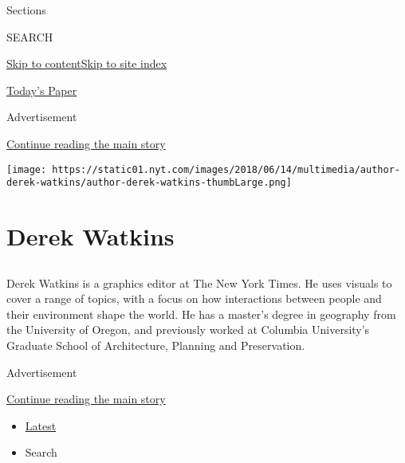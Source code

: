 Sections

SEARCH

\protect\hyperlink{site-content}{Skip to
content}\protect\hyperlink{site-index}{Skip to site index}

\href{https://myaccount.nytimes.com/auth/login?response_type=cookie\&client_id=vi}{}

\href{https://www.nytimes.com/section/todayspaper}{Today's Paper}

Advertisement

\protect\hyperlink{after-top}{Continue reading the main story}

\texttt{[image: https://static01.nyt.com/images/2018/06/14/multimedia/author-derek-watkins/author-derek-watkins-thumbLarge.png]}

\hypertarget{derek-watkins}{%
\section{Derek Watkins}\label{derek-watkins}}

\subsection{}

Derek Watkins is a graphics editor at The New York Times. He uses
visuals to cover a range of topics, with a focus on how interactions
between people and their environment shape the world. He has a master's
degree in geography from the University of Oregon, and previously worked
at Columbia University's Graduate School of Architecture, Planning and
Preservation.

Advertisement

\protect\hyperlink{after-mid1}{Continue reading the main story}

\begin{itemize}
\tightlist
\item
  \protect\hyperlink{stream-panel}{Latest}
\item
  Search
\end{itemize}

